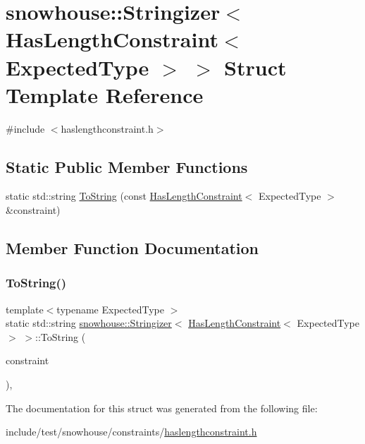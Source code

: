 \hypertarget{structsnowhouse_1_1Stringizer_3_01HasLengthConstraint_3_01ExpectedType_01_4_01_4}{}\section{snowhouse\+::Stringizer$<$ Has\+Length\+Constraint$<$ Expected\+Type $>$ $>$ Struct Template Reference}
\label{structsnowhouse_1_1Stringizer_3_01HasLengthConstraint_3_01ExpectedType_01_4_01_4}


{\ttfamily \#include $<$haslengthconstraint.\+h$>$}

\subsection*{Static Public Member Functions}
\begin{DoxyCompactItemize}
\item 
static std\+::string \mbox{\hyperlink{structsnowhouse_1_1Stringizer_3_01HasLengthConstraint_3_01ExpectedType_01_4_01_4_a3fc285ef91bf929afef05550efbed587}{To\+String}} (const \mbox{\hyperlink{structsnowhouse_1_1HasLengthConstraint}{Has\+Length\+Constraint}}$<$ Expected\+Type $>$ \&constraint)
\end{DoxyCompactItemize}


\subsection{Member Function Documentation}
\mbox{\label{structsnowhouse_1_1Stringizer_3_01HasLengthConstraint_3_01ExpectedType_01_4_01_4_a3fc285ef91bf929afef05550efbed587}} 
\subsubsection{\texorpdfstring{ToString()}{ToString()}}
{\footnotesize\ttfamily template$<$typename Expected\+Type $>$ \\
static std\+::string \mbox{\hyperlink{structsnowhouse_1_1Stringizer}{snowhouse\+::\+Stringizer}}$<$ \mbox{\hyperlink{structsnowhouse_1_1HasLengthConstraint}{Has\+Length\+Constraint}}$<$ Expected\+Type $>$ $>$\+::To\+String (\begin{DoxyParamCaption}\item[{const \mbox{\hyperlink{structsnowhouse_1_1HasLengthConstraint}{Has\+Length\+Constraint}}$<$ Expected\+Type $>$ \&}]{constraint }\end{DoxyParamCaption})\hspace{0.3cm}{\ttfamily [inline]}, {\ttfamily [static]}}



The documentation for this struct was generated from the following file\+:\begin{DoxyCompactItemize}
\item 
include/test/snowhouse/constraints/\mbox{\hyperlink{haslengthconstraint_8h}{haslengthconstraint.\+h}}\end{DoxyCompactItemize}
